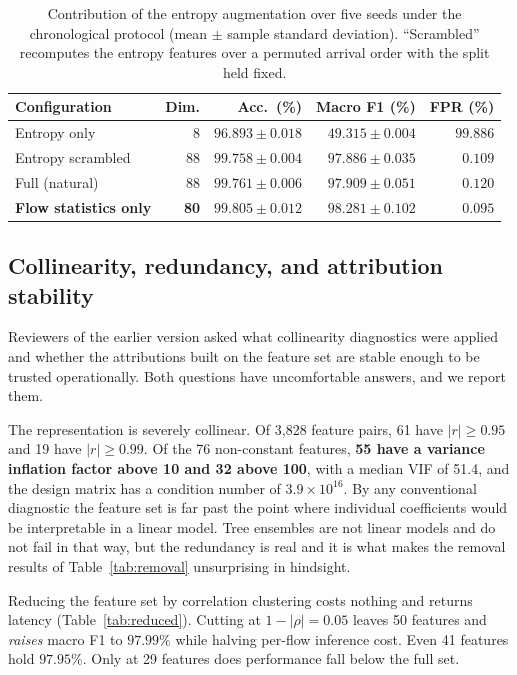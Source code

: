 \documentclass{ieeeaccess}
\begin{document}
\begin{table}[!t]
\caption{Contribution of the entropy augmentation over five seeds under the
chronological protocol (mean $\pm$ sample standard deviation). ``Scrambled''
recomputes the entropy features over a permuted arrival order with the split
held fixed.}
\centering
\label{tab:entropycontrib}
\footnotesize
\setlength{\tabcolsep}{1.5pt}
\renewcommand{\arraystretch}{1.2}
\begin{tabular}{@{}lrrrr@{}}
\toprule
\textbf{Configuration} & \textbf{Dim.} & \textbf{Acc.\ (\%)} &
\textbf{Macro F1 (\%)} & \textbf{FPR (\%)} \\
\midrule
Entropy only          & 8  & $96.893 \pm 0.018$ & $49.315 \pm 0.004$ & $99.886$ \\
Entropy scrambled     & 88 & $99.758 \pm 0.004$ & $97.886 \pm 0.035$ & $0.109$ \\
Full (natural)        & 88 & $99.761 \pm 0.006$ & $97.909 \pm 0.051$ & $0.120$ \\
\textbf{Flow statistics only} & \textbf{80} & $\mathbf{99.805 \pm 0.012}$ &
$\mathbf{98.281 \pm 0.102}$ & $\mathbf{0.095}$ \\
\bottomrule
\end{tabular}
\end{table}

\subsection{Collinearity, redundancy, and attribution stability}
\label{sec:shapstability}
Reviewers of the earlier version asked what collinearity diagnostics were applied
and whether the attributions built on the feature set are stable enough to be
trusted operationally. Both questions have uncomfortable answers, and we report
them.

The representation is severely collinear. Of 3{,}828 feature pairs, 61 have
$|r| \geq 0.95$ and 19 have $|r| \geq 0.99$. Of the 76 non-constant features,
\textbf{55 have a variance inflation factor above 10 and 32 above 100}, with a
median VIF of 51.4, and the design matrix has a condition number of
$3.9 \times 10^{16}$. By any conventional diagnostic the feature set is far past
the point where individual coefficients would be interpretable in a linear model.
Tree ensembles are not linear models and do not fail in that way, but the
redundancy is real and it is what makes the removal results of
Table~\ref{tab:removal} unsurprising in hindsight.

Reducing the feature set by correlation clustering costs nothing and returns
latency (Table~\ref{tab:reduced}). Cutting at $1 - |\rho| = 0.05$ leaves 50
features and \emph{raises} macro F1 to $97.99\%$ while halving per-flow inference
cost. Even 41 features hold $97.95\%$. Only at 29 features does performance fall
below the full set.
\end{document}
